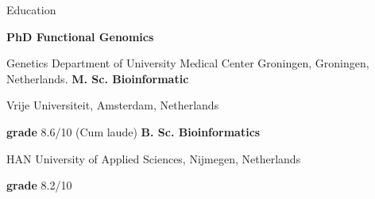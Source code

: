 \begin{rubric}{Education}

\entry*[May 2015 -- ]%
	\textbf{PhD Functional Genomics} \par
	Genetics Department of University Medical Center Groningen, Groningen, Netherlands.
%
%
	\textbf{M. Sc. Bioinformatic} \par
	Vrije Universiteit, Amsterdam, Netherlands \par
	\textbf{grade} 8.6/10 (Cum laude)
%
%
	\textbf{B. Sc. Bioinformatics} \par
	HAN University of Applied Sciences, Nijmegen, Netherlands \par
	\textbf{grade} 8.2/10
%
\end{rubric}

